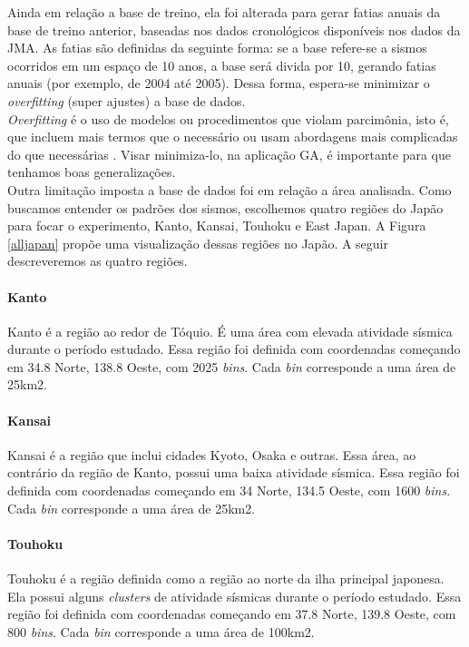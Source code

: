 Ainda em relação a base de treino, ela foi alterada para gerar fatias anuais da base de treino anterior, baseadas nos dados cronológicos disponíveis nos dados da JMA. As fatias são definidas da seguinte forma: se a base refere-se a sismos ocorridos em um espaço de 10 anos, a base será divida por 10, gerando fatias anuais (por exemplo, de 2004 até 2005). Dessa forma, espera-se minimizar o {\it overfitting} (super ajustes) a base de dados.\\

{\it Overfitting} é o uso de modelos ou procedimentos que violam parcimônia, isto é, que incluem mais termos que o necessário ou usam abordagens mais complicadas do que necessárias \cite{hawkins2004problem}. Visar minimiza-lo, na aplicação GA, é importante para que tenhamos boas generalizações.\\

Outra limitação imposta a base de dados foi em relação a área analisada. Como buscamos entender os padrões dos sismos, escolhemos quatro regiões do Japão para focar o experimento, Kanto, Kansai, Touhoku e East Japan. A Figura \ref{alljapan} propõe uma visualização dessas regiões no Japão. A seguir descreveremos as quatro regiões.\\

\paragraph{Kanto} Kanto é a região ao redor de Tóquio. É uma área com elevada atividade sísmica durante o período estudado. Essa região foi definida com coordenadas começando em 34.8 Norte, 138.8 Oeste, com  2025 {\it bins}. Cada {\it bin} corresponde a uma área de 25km2.\\

\paragraph{Kansai} Kansai é a região que inclui cidades Kyoto, Osaka e outras. Essa área, ao contrário da região de Kanto, possui uma baixa atividade sísmica. Essa região foi definida com coordenadas começando em 34 Norte, 134.5 Oeste, com  1600 {\it bins}. Cada {\it bin} corresponde a uma área de 25km2.\\

\paragraph{Touhoku} Touhoku é a região definida como a região ao norte da ilha principal japonesa. Ela possui alguns {\it clusters} de atividade sísmicas durante o período estudado. Essa região foi definida com coordenadas começando em 37.8 Norte, 139.8 Oeste, com  800 {\it bins}. Cada {\it bin} corresponde a uma área de 100km2. \\

